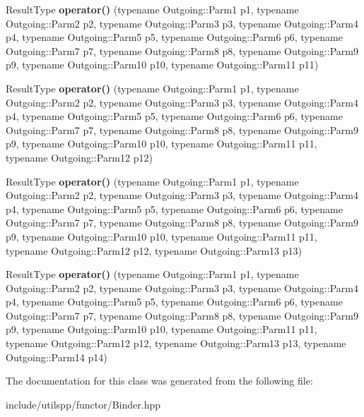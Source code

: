 \begin{DoxyCompactItemize}
\item 
\hypertarget{classutilspp_1_1BinderFirst_a7c7decc3240563eb2df479b627a90cf1}{Result\-Type {\bfseries operator()} (typename Outgoing\-::\-Parm1 p1, typename Outgoing\-::\-Parm2 p2, typename Outgoing\-::\-Parm3 p3, typename Outgoing\-::\-Parm4 p4, typename Outgoing\-::\-Parm5 p5, typename Outgoing\-::\-Parm6 p6, typename Outgoing\-::\-Parm7 p7, typename Outgoing\-::\-Parm8 p8, typename Outgoing\-::\-Parm9 p9, typename Outgoing\-::\-Parm10 p10, typename Outgoing\-::\-Parm11 p11)}\label{classutilspp_1_1BinderFirst_a7c7decc3240563eb2df479b627a90cf1}

\item 
\hypertarget{classutilspp_1_1BinderFirst_a7ae7e7c68f34f42dc0029c37abc0a349}{Result\-Type {\bfseries operator()} (typename Outgoing\-::\-Parm1 p1, typename Outgoing\-::\-Parm2 p2, typename Outgoing\-::\-Parm3 p3, typename Outgoing\-::\-Parm4 p4, typename Outgoing\-::\-Parm5 p5, typename Outgoing\-::\-Parm6 p6, typename Outgoing\-::\-Parm7 p7, typename Outgoing\-::\-Parm8 p8, typename Outgoing\-::\-Parm9 p9, typename Outgoing\-::\-Parm10 p10, typename Outgoing\-::\-Parm11 p11, typename Outgoing\-::\-Parm12 p12)}\label{classutilspp_1_1BinderFirst_a7ae7e7c68f34f42dc0029c37abc0a349}

\item 
\hypertarget{classutilspp_1_1BinderFirst_a3db2a8159433982942440934afbdac3e}{Result\-Type {\bfseries operator()} (typename Outgoing\-::\-Parm1 p1, typename Outgoing\-::\-Parm2 p2, typename Outgoing\-::\-Parm3 p3, typename Outgoing\-::\-Parm4 p4, typename Outgoing\-::\-Parm5 p5, typename Outgoing\-::\-Parm6 p6, typename Outgoing\-::\-Parm7 p7, typename Outgoing\-::\-Parm8 p8, typename Outgoing\-::\-Parm9 p9, typename Outgoing\-::\-Parm10 p10, typename Outgoing\-::\-Parm11 p11, typename Outgoing\-::\-Parm12 p12, typename Outgoing\-::\-Parm13 p13)}\label{classutilspp_1_1BinderFirst_a3db2a8159433982942440934afbdac3e}

\item 
\hypertarget{classutilspp_1_1BinderFirst_adc155e1796230468a729ee2103819d1e}{Result\-Type {\bfseries operator()} (typename Outgoing\-::\-Parm1 p1, typename Outgoing\-::\-Parm2 p2, typename Outgoing\-::\-Parm3 p3, typename Outgoing\-::\-Parm4 p4, typename Outgoing\-::\-Parm5 p5, typename Outgoing\-::\-Parm6 p6, typename Outgoing\-::\-Parm7 p7, typename Outgoing\-::\-Parm8 p8, typename Outgoing\-::\-Parm9 p9, typename Outgoing\-::\-Parm10 p10, typename Outgoing\-::\-Parm11 p11, typename Outgoing\-::\-Parm12 p12, typename Outgoing\-::\-Parm13 p13, typename Outgoing\-::\-Parm14 p14)}\label{classutilspp_1_1BinderFirst_adc155e1796230468a729ee2103819d1e}

\end{DoxyCompactItemize}


The documentation for this class was generated from the following file\-:\begin{DoxyCompactItemize}
\item 
include/utilspp/functor/Binder.\-hpp\end{DoxyCompactItemize}
